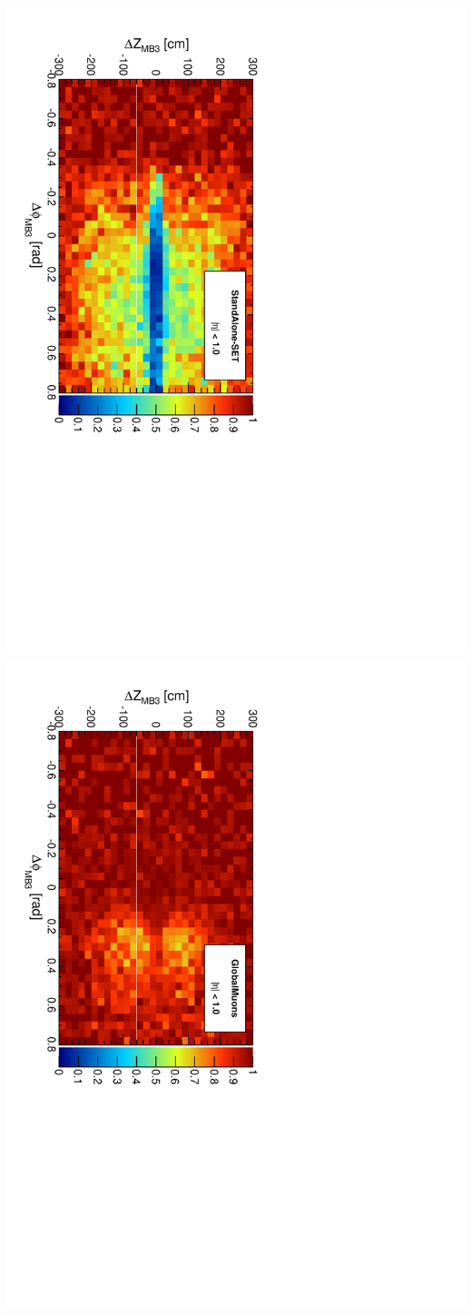 \documentclass[compress]{beamer}
\begin{document}
\begin{frame}
\begin{center}
\includegraphics[height=0.45\linewidth, angle=90]{mb3_StandAloneUpdatedSET.pdf}
\includegraphics[height=0.45\linewidth, angle=90]{mb3_GlobalMuons.pdf}
\end{center}
\end{frame}
\end{document}

